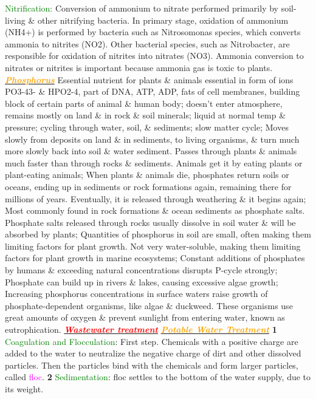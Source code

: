 \documentclass{article}
\newcommand{\red}[1]{\textcolor{red}{#1}}
\newcommand{\green}[1]{\textcolor{green}{#1}}
\newcommand{\pink}[1]{\textcolor{magenta}{#1}}
\newcommand{\orange}[1]{\textcolor{orange}{#1}}
\newcommand{\mysection}[1]{\underline{{\textbf{\textit{\red{#1}}}}}}
\newcommand{\mysubsection}[1]{\underline{\textbf{{\textit{\orange{#1}}}}}}
\newcommand{\mysubsub}[1]{{{\green{#1}}}}
\begin{document}
\begin{multicols*}{4}
			\mysubsub{Nitrification: } 
				Conversion of ammonium to nitrate performed primarily by soil-living \& other nitrifying bacteria. In primary stage, oxidation of ammonium (NH4+) is performed by bacteria such as Nitrosomonas species, which converts ammonia to nitrites (NO2). Other bacterial species, such as Nitrobacter, are responsible for oxidation of nitrites into nitrates (NO3). Ammonia conversion to nitrates or nitrites is important because ammonia gas is toxic to plants.
		\mysubsection{Phosphorus}
 			Essential nutrient for plants \& animals essential in form of ions PO3-43- \& HPO2-4, part of DNA, ATP, ADP, fats of cell membranes, building block of certain parts of animal \& human body; doesn’t enter atmosphere, remains mostly on land \& in rock \& soil minerals; liquid at normal temp \& pressure; cycling through water, soil, \& sediments; slow matter cycle; Moves slowly from deposits on land \& in sediments, to living organisms, \& turn much more slowly back into soil \& water sediment. Passes through plants \& animals much faster than through rocks \& sediments. Animals get it by eating plants or plant-eating animals; When plants \& animals die, phosphates return soils or oceans, ending up in sediments or rock formations again, remaining there for millions of years. Eventually, it is released through weathering \& it begins again; Most commonly found in rock formations \& ocean sediments as phosphate salts. Phosphate salts released through rocks usually dissolve in soil water \& will be absorbed by plants; Quantities of phosphorus in soil are small, often making them limiting factors for plant growth. Not very water-soluble, making them limiting factors for plant growth in marine ecosystems; Constant additions of phosphates by humans \& exceeding natural concentrations disrupts P-cycle strongly; Phosphate can build up in rivers \& lakes, causing excessive algae growth; Increasing phosphorus concentrations in surface waters raise growth of phosphate-dependent organisms, like algae \& duckweed. These organisms use great amounts of oxygen \& prevent sunlight from entering water, known as eutrophication.
   	\mysection{Wastewater treatment}
    	\mysubsection{Potable Water Treatment}
    		\textbf{1} \mysubsub{Coagulation and Flocculation}: First step. Chemicals with a positive charge are added to the water to neutralize the negative charge of dirt and other dissolved particles. Then the particles bind with the chemicals and form larger particles, called \pink{floc}.
    		\textbf{2} \mysubsub{Sedimentation}: floc settles to the bottom of the water supply, due to its weight.

\end{multicols*}
\end{document}
